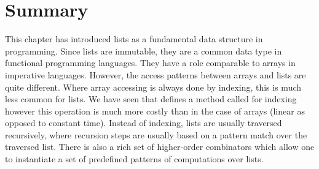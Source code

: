 \section{Summary}

This chapter has introduced lists as a fundamental data structure in
programming. Since lists are immutable, they are a common data type in
functional programming languages. They have a role comparable to
arrays in imperative languages. However, the access patterns between
arrays and lists are quite different. Where array accessing is always
done by indexing, this is much less common for lists.  We have seen
that  defines a method called  for indexing
however this operation is much more costly than in the case of arrays
(linear as opposed to constant time). Instead of indexing, lists are
usually traversed recursively, where recursion steps are usually based
on a pattern match over the traversed list. There is also a rich set of
higher-order combinators which allow one to instantiate a set of
predefined patterns of computations over lists.

